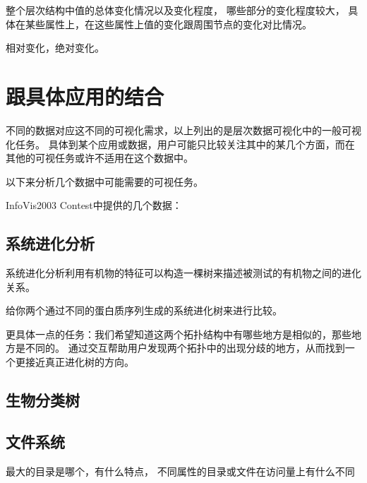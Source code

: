 \documentclass{article}
\begin{document}
整个层次结构中值的总体变化情况以及变化程度，
哪些部分的变化程度较大，
具体在某些属性上，在这些属性上值的变化跟周围节点的变化对比情况。

相对变化，绝对变化。

\section{跟具体应用的结合}

不同的数据对应这不同的可视化需求，以上列出的是层次数据可视化中的一般可视化任务。
具体到某个应用或数据，用户可能只比较关注其中的某几个方面，而在其他的可视任务或许不适用在这个数据中。

以下来分析几个数据中可能需要的可视任务。

InfoVis2003 Contest中提供的几个数据：

\subsection{系统进化分析}

系统进化分析利用有机物的特征可以构造一棵树来描述被测试的有机物之间的进化关系。

给你两个通过不同的蛋白质序列生成的系统进化树来进行比较。

更具体一点的任务：我们希望知道这两个拓扑结构中有哪些地方是相似的，那些地方是不同的。
通过交互帮助用户发现两个拓扑中的出现分歧的地方，从而找到一个更接近真正进化树的方向。

\subsection{生物分类树}

\subsection{文件系统}

最大的目录是哪个，有什么特点，
不同属性的目录或文件在访问量上有什么不同




\end{document}
